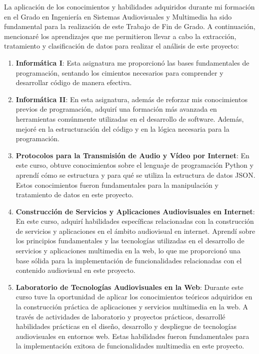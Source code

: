 \documentclass[a4paper, 12pt]{book}
\begin{document}
La aplicación de los conocimientos y habilidades adquiridos durante mi formación en el Grado en Ingeniería en Sistemas Audiovisuales y Multimedia ha sido fundamental para la realización de este Trabajo de Fin de Grado. A continuación, mencionaré los aprendizajes que me permitieron llevar a cabo la extracción, tratamiento y clasificación de datos para realizar el análisis de este proyecto:

\begin{enumerate}
  \item \textbf{Informática I}: Esta asignatura me proporcionó las bases fundamentales de programación, sentando los cimientos necesarios para comprender y desarrollar código de manera efectiva.
  \item \textbf{Informática II}: En esta asignatura, además de reforzar mis conocimientos previos de programación, adquirí una formación más avanzada en herramientas comúnmente utilizadas en el desarrollo de software. Además, mejoré en la estructuración del código y en la lógica necesaria para la programación.
  \item \textbf{Protocolos para la Transmisión de Audio y Vídeo por Internet}: En este curso, obtuve conocimientos sobre el lenguaje de programación Python y aprendí cómo se estructura y para qué se utiliza la estructura de datos JSON. Estos conocimientos fueron fundamentales para la manipulación y tratamiento de datos en este proyecto.
  \item \textbf{Construcción de Servicios y Aplicaciones Audiovisuales en Internet}: En este curso, adquirí habilidades específicas relacionadas con la construcción de servicios y aplicaciones en el ámbito audiovisual en internet. Aprendí sobre los principios fundamentales y las tecnologías utilizadas en el desarrollo de servicios y aplicaciones multimedia en la web, lo que me proporcionó una base sólida para la implementación de funcionalidades relacionadas con el contenido audiovisual en este proyecto.
  \item \textbf{Laboratorio de Tecnologías Audiovisuales en la Web}: Durante este curso tuve la oportunidad de aplicar los conocimientos teóricos adquiridos en la construcción práctica de aplicaciones y servicios multimedia en la web. A través de actividades de laboratorio y proyectos prácticos, desarrollé habilidades prácticas en el diseño, desarrollo y despliegue de tecnologías audiovisuales en entornos web. Estas habilidades fueron fundamentales para la implementación exitosa de funcionalidades multimedia en este proyecto.
\end{enumerate}
\end{document}
